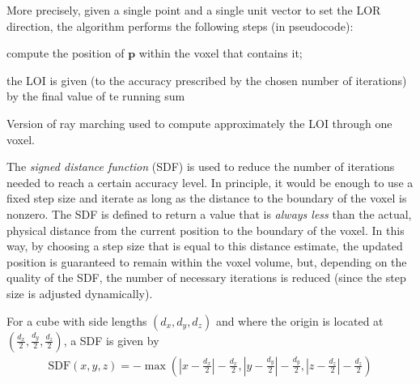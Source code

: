 \documentclass[a4paper, 11pt]{article}
\begin{document}
  More precisely, given a single point and a single unit vector to set the LOR direction, the algorithm performs the following steps (in pseudocode):
  \vspace{0.5cm}\\
  \begin{algorithm}[H]
    compute the position of $\mathbf{p}$ within the voxel that contains it;
    

    the LOI is given (to the accuracy prescribed by the chosen number of iterations) by the final value of te running sum\;
    \caption{Version of ray marching used to compute approximately the LOI through one voxel.}
  \end{algorithm}
  \vspace{0.5cm}
  The \textsl{signed distance function} (SDF) is used to reduce the number of iterations needed to reach a certain accuracy level. In principle, it would be enough to use a fixed step size and iterate as long as the distance to the boundary of the voxel is nonzero. The SDF is defined to return a value that is \textsl{always less} than the actual, physical distance from the current position to the boundary of the voxel. In this way, by choosing a step size that is equal to this distance estimate, the updated position is guaranteed to remain within the voxel volume, but, depending on the quality of the SDF, the number of necessary iterations is reduced (since the step size is adjusted dynamically).

  For a cube with side lengths $(d_x, d_y, d_z)$ and where the origin is located at $(\frac{d_x}{2}, \frac{d_y}{2}, \frac{d_z}{2})$, a SDF is given by
  \begin{align}
    \text{SDF}(x, y, z) = -\max\left(\left| x - \frac{d_x}{2} \right| - \frac{d_x}{2}, \left| y - \frac{d_y}{2} \right| - \frac{d_y}{2}, \left| z - \frac{d_z}{2} \right| - \frac{d_z}{2}\right)
  \end{align}  
\end{document}
